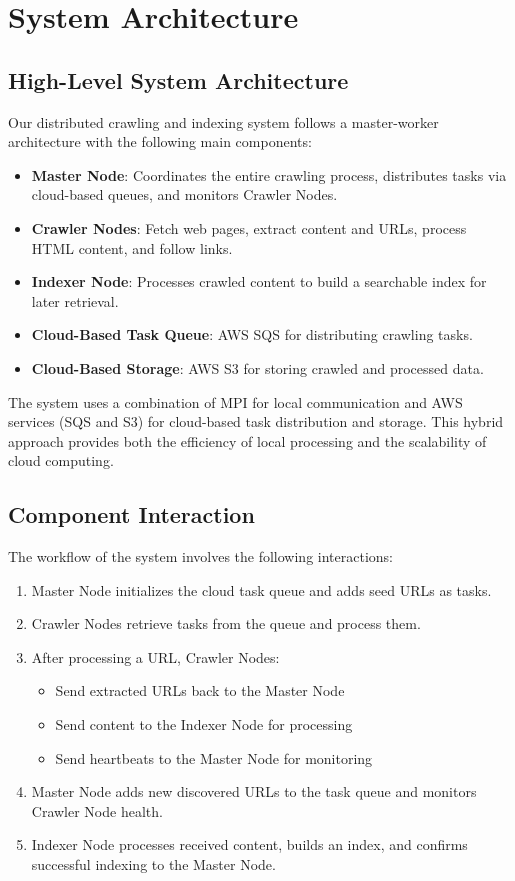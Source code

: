 \documentclass[12pt]{article}
\begin{document}
\section{System Architecture}

\subsection{High-Level System Architecture}
Our distributed crawling and indexing system follows a master-worker architecture with the following main components:

\begin{itemize}
    \item \textbf{Master Node}: Coordinates the entire crawling process, distributes tasks via cloud-based queues, and monitors Crawler Nodes.
    \item \textbf{Crawler Nodes}: Fetch web pages, extract content and URLs, process HTML content, and follow links.
    \item \textbf{Indexer Node}: Processes crawled content to build a searchable index for later retrieval.
    \item \textbf{Cloud-Based Task Queue}: AWS SQS for distributing crawling tasks.
    \item \textbf{Cloud-Based Storage}: AWS S3 for storing crawled and processed data.
\end{itemize}

The system uses a combination of MPI for local communication and AWS services (SQS and S3) for cloud-based task distribution and storage. This hybrid approach provides both the efficiency of local processing and the scalability of cloud computing.

\subsection{Component Interaction}
The workflow of the system involves the following interactions:

\begin{enumerate}
    \item Master Node initializes the cloud task queue and adds seed URLs as tasks.
    \item Crawler Nodes retrieve tasks from the queue and process them.
    \item After processing a URL, Crawler Nodes:
    \begin{itemize}
        \item Send extracted URLs back to the Master Node
        \item Send content to the Indexer Node for processing
        \item Send heartbeats to the Master Node for monitoring
    \end{itemize}
    \item Master Node adds new discovered URLs to the task queue and monitors Crawler Node health.
    \item Indexer Node processes received content, builds an index, and confirms successful indexing to the Master Node.
\end{enumerate}
\end{document}
